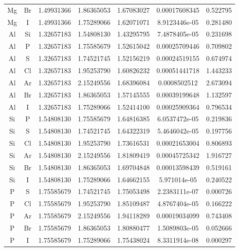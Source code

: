 \begin{longtable}{@{}ccccccc@{}}
Mg &  Br    &     1.49931366   &   1.86365053  &    1.67083027 &  0.00017608345  &  0.522795\\
Mg &  I     &     1.49931366   &   1.75289066  &    1.62071071 &  8.9123446e-05  &  0.281480\\
Al &  Si    &     1.32657183   &   1.54808130  &    1.43295795 &  7.4878405e-05  &  0.231698\\
Al &  P     &     1.32657183   &   1.75585679  &    1.52615042 &  0.00025709446  &  0.709802\\
Al &  S     &     1.32657183   &   1.74521745  &    1.52156219 &  0.00024519155  &  0.674974\\
Al &  Cl    &     1.32657183   &   1.95253790  &    1.60826232 &  0.00051441718  &  1.443233\\
Al &  Ar    &     1.32657183   &   2.15249556  &    1.68396084 &   0.0008502512  &  2.673094\\
Al &  Br    &     1.32657183   &   1.86365053  &    1.57145555 &  0.00039199648  &  1.132597\\
Al &  I     &     1.32657183   &   1.75289066  &    1.52414100 &  0.00025909364  &  0.796534\\
Si &  P     &     1.54808130   &   1.75585679  &    1.64816385 &  6.0537472e-05  &  0.219836\\
Si &  S     &     1.54808130   &   1.74521745  &    1.64322319 &  5.4646042e-05  &  0.197756\\
Si &  Cl    &     1.54808130   &   1.95253790  &    1.73616531 &  0.00021653004  &  0.806893\\
Si &  Ar    &     1.54808130   &   2.15249556  &    1.81809419 &  0.00045725342  &  1.916727\\
Si &  Br    &     1.54808130   &   1.86365053  &    1.69704848 &  0.00013598439  &  0.519161\\
Si &  I     &     1.54808130   &   1.75289066  &    1.64662155 &   5.971014e-05  &  0.240522\\
P  &  S     &     1.75585679   &   1.74521745  &    1.75053498 &  2.2383111e-07  &  0.000726\\
P  &  Cl    &     1.75585679   &   1.95253790  &    1.85109487 &  4.8767404e-05  &  0.166222\\
P  &  Ar    &     1.75585679   &   2.15249556  &    1.94118289 &  0.00019034099  &  0.743408\\
P  &  Br    &     1.75585679   &   1.86365053  &    1.80880477 &  1.5089803e-05  &  0.052666\\
P  &  I     &     1.75585679   &   1.75289066  &    1.75438024 &  8.3311914e-08  &  0.000297\\

\end{longtable}
